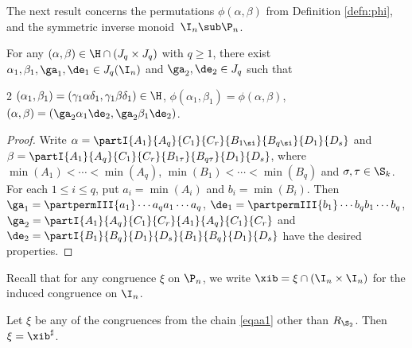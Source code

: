 The next result concerns the permutations $\phi(\alpha,\beta)$ from Definition \ref{defn:phi}, and the symmetric inverse monoid~$\I_n\sub\P_n$.

%
\begin{lemma}
\label{lemma-aa1a}
For any $(\alpha,\beta)\in {\H}\cap (J_q\times J_q)$ with $q\geq 1$, there exist $\alpha_1,\beta_1,\ga_1,\de_1\in J_q(\I_n)$ and $\ga_2,\de_2\in J_q$ such that~
\begin{itemize}
\begin{multicols}2
 $(\alpha_1,\beta_1)=(\gamma_1\alpha\delta_1,\gamma_1\beta\delta_1) \in{\H}$,
 $\phi(\alpha_1,\beta_1)=\phi(\alpha,\beta)$,
 $(\alpha,\beta)=(\ga_2\alpha_1\de_2,\ga_2\beta_1\de_2)$.
\end{multicols}\end{itemize}
\end{lemma}

\begin{proof}
Write
$\alpha=\partI{A_1}{A_q}{C_1}{C_r}{B_{1\si}}{B_{q\si}}{D_1}{D_s}$
and
$\beta=\partI{A_1}{A_q}{C_1}{C_r}{B_{1\tau}}{B_{q\tau}}{D_1}{D_s}$, where $\min(A_1)<\cdots<\min(A_q)$, $\min(B_1)<\cdots<\min(B_q)$ and $\sigma,\tau\in\S_k$.  For each $1\leq i\leq q$, put $a_i=\min(A_i)$ and $b_i=\min(B_i)$.  Then $\ga_1=\partpermIII{a_1}\cdots{a_q}{a_1}\cdots{a_q}$, $\de_1=\partpermIII{b_1}\cdots{b_q}{b_1}\cdots{b_q}$, $\ga_2=\partI{A_1}{A_q}{C_1}{C_r}{A_1}{A_q}{C_1}{C_r}$ and $\de_2=\partI{B_1}{B_q}{D_1}{D_s}{B_1}{B_q}{D_1}{D_s}$
have the desired properties. \end{proof}


Recall that for any congruence $\xi$ on $\P_n$, we write $\xib=\xi\cap (\I_n\times\I_n)$ for the induced congruence on $\I_n$.



\begin{lemma}
\label{lemma-aa2}
Let $\xi$ be any of the congruences from the chain \eqref{eqaa1} other than $R_{\S_2}$.  Then $\xi=\xib^\sharp$.

\end{lemma}

